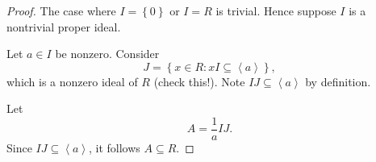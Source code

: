 \documentclass[pmath441]{subfiles}
\begin{document}
    \begin{proof}
        The case where $I = \left\lbrace 0 \right\rbrace$ or $I=R$ is trivial. Hence suppose $I$ is a nontrivial proper ideal.

        Let $a\in I$ be nonzero. Consider
        \begin{equation*}
            J = \left\lbrace x\in R: xI\subseteq\left< a \right>  \right\rbrace,
        \end{equation*}
        which is a nonzero ideal of $R$ (check this!). Note $IJ\subseteq\left< a \right>$ by definition. 

        Let
        \begin{equation*}
            A = \frac{1}{a}IJ.
        \end{equation*}
        Since $IJ\subseteq\left< a \right>$, it follows $A\subseteq R$. 


\end{proof}
\end{document}
